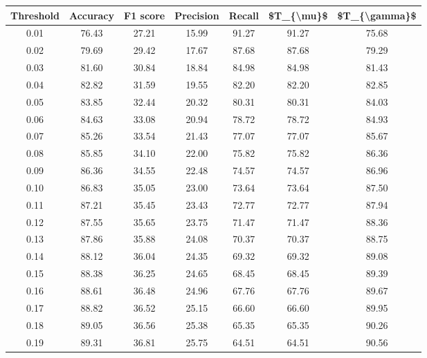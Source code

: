 \begin{tabular}{|c|c|c|c|c|c|c|}
\hline
 Threshold &  Accuracy &  F1 score &  Precision &  Recall &  \$T\_\{\textbackslash mu\}\$ &  \$T\_\{\textbackslash gamma\}\$ \\
\hline
      0.01 &     76.43 &     27.21 &      15.99 &   91.27 &      91.27 &         75.68 \\
      0.02 &     79.69 &     29.42 &      17.67 &   87.68 &      87.68 &         79.29 \\
      0.03 &     81.60 &     30.84 &      18.84 &   84.98 &      84.98 &         81.43 \\
      0.04 &     82.82 &     31.59 &      19.55 &   82.20 &      82.20 &         82.85 \\
      0.05 &     83.85 &     32.44 &      20.32 &   80.31 &      80.31 &         84.03 \\
      0.06 &     84.63 &     33.08 &      20.94 &   78.72 &      78.72 &         84.93 \\
      0.07 &     85.26 &     33.54 &      21.43 &   77.07 &      77.07 &         85.67 \\
      0.08 &     85.85 &     34.10 &      22.00 &   75.82 &      75.82 &         86.36 \\
      0.09 &     86.36 &     34.55 &      22.48 &   74.57 &      74.57 &         86.96 \\
      0.10 &     86.83 &     35.05 &      23.00 &   73.64 &      73.64 &         87.50 \\
      0.11 &     87.21 &     35.45 &      23.43 &   72.77 &      72.77 &         87.94 \\
      0.12 &     87.55 &     35.65 &      23.75 &   71.47 &      71.47 &         88.36 \\
      0.13 &     87.86 &     35.88 &      24.08 &   70.37 &      70.37 &         88.75 \\
      0.14 &     88.12 &     36.04 &      24.35 &   69.32 &      69.32 &         89.08 \\
      0.15 &     88.38 &     36.25 &      24.65 &   68.45 &      68.45 &         89.39 \\
      0.16 &     88.61 &     36.48 &      24.96 &   67.76 &      67.76 &         89.67 \\
      0.17 &     88.82 &     36.52 &      25.15 &   66.60 &      66.60 &         89.95 \\
      0.18 &     89.05 &     36.56 &      25.38 &   65.35 &      65.35 &         90.26 \\
      0.19 &     89.31 &     36.81 &      25.75 &   64.51 &      64.51 &         90.56 \\

\end{tabular}
